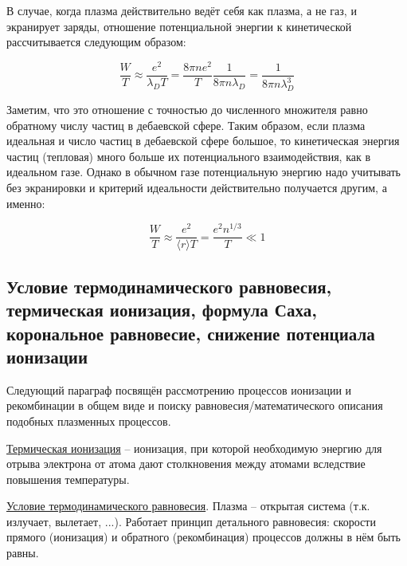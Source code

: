 \documentclass[10pt, a4paper]{article}
\begin{document}
В случае, когда плазма действительно ведёт себя как плазма, а не газ, и экранирует заряды, отношение потенциальной энергии к кинетической рассчитывается следующим образом:

\begin{equation}
	\frac{W}{T} \approx \frac{e^2}{\lambda_D T} = \frac{8\pi n e^2}{T}\frac{1}{8\pi n\lambda_D} = \frac{1}{8\pi n \lambda_D^3}
\end{equation}

Заметим, что это отношение с точностью до численного множителя равно обратному числу частиц в дебаевской сфере. Таким образом, если плазма идеальная и число частиц в дебаевской сфере большое, то кинетическая энергия частиц (тепловая) много больше их потенциального взаимодействия, как в идеальном газе. Однако в обычном газе потенциальную энергию надо учитывать без экранировки и критерий идеальности действительно получается другим, а именно:

\begin{equation}
	\frac{W}{T} \approx \frac{e^2}{\langle r \rangle T} = \frac{e^2 n^{1/3}}{T} \ll 1
\end{equation}

\subsection{Условие термодинамического равновесия, термическая ионизация, формула Саха, корональное равновесие, снижение потенциала ионизации}

Следующий параграф посвящён рассмотрению процессов ионизации и рекомбинации в общем виде и поиску равновесия/математического описания подобных плазменных процессов.

\uline{Термическая ионизация} -- ионизация, при которой необходимую энергию для отрыва электрона от атома дают столкновения между атомами вследствие повышения температуры.

\uline{Условие термодинамического равновесия}. Плазма -- открытая система (т.к. излучает, вылетает, ...). Работает принцип детального равновесия: скорости прямого (ионизация) и обратного (рекомбинация) процессов должны в нём быть равны.
\end{document}
